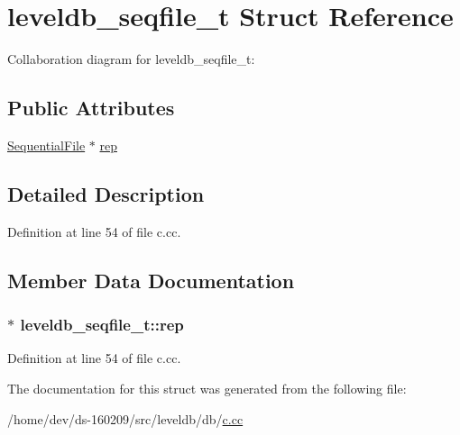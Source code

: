 \hypertarget{structleveldb__seqfile__t}{}\section{leveldb\+\_\+seqfile\+\_\+t Struct Reference}
\label{structleveldb__seqfile__t}


Collaboration diagram for leveldb\+\_\+seqfile\+\_\+t\+:
\subsection*{Public Attributes}
\begin{DoxyCompactItemize}
\item 
\hyperlink{classleveldb_1_1_sequential_file}{Sequential\+File} $\ast$ \hyperlink{structleveldb__seqfile__t_a84b4a8638a6ad109e65b3c7923fde915}{rep}
\end{DoxyCompactItemize}


\subsection{Detailed Description}


Definition at line 54 of file c.\+cc.



\subsection{Member Data Documentation}
\hypertarget{structleveldb__seqfile__t_a84b4a8638a6ad109e65b3c7923fde915}{}
\subsubsection[{rep}]{$\ast$ leveldb\+\_\+seqfile\+\_\+t\+::rep}\label{structleveldb__seqfile__t_a84b4a8638a6ad109e65b3c7923fde915}


Definition at line 54 of file c.\+cc.



The documentation for this struct was generated from the following file\+:\begin{DoxyCompactItemize}
\item 
/home/dev/ds-\/160209/src/leveldb/db/\hyperlink{c_8cc}{c.\+cc}\end{DoxyCompactItemize}
